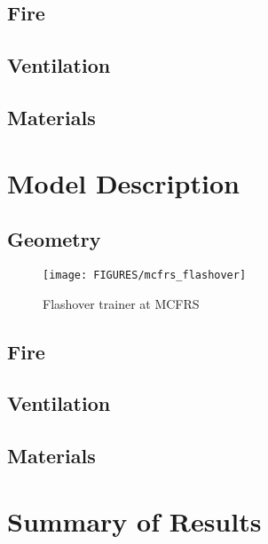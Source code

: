 \subsection{Fire}

\subsection{Ventilation}

\subsection{Materials}

\section{Model Description}

\subsection{Geometry}

\begin{figure}[\figoptions]
\begin{center}
\texttt{[image: FIGURES/mcfrs\_flashover]}
\end{center}
\caption {Flashover trainer at MCFRS}
\label{figflashoversmoke}%
\end{figure}

\subsection{Fire}

\subsection{Ventilation}

\subsection{Materials}

\section{Summary of Results}


